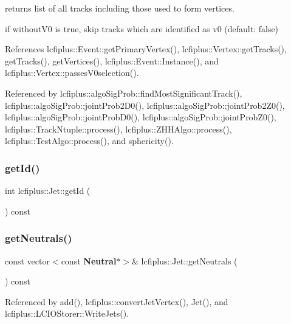 returns list of all tracks including those used to form vertices. 

if without\+V0 is true, skip tracks which are identified as v0 (default\+: false) 

References lcfiplus\+::\+Event\+::get\+Primary\+Vertex(), lcfiplus\+::\+Vertex\+::get\+Tracks(), get\+Tracks(), get\+Vertices(), lcfiplus\+::\+Event\+::\+Instance(), and lcfiplus\+::\+Vertex\+::passes\+V0selection().



Referenced by lcfiplus\+::algo\+Sig\+Prob\+::find\+Most\+Significant\+Track(), lcfiplus\+::algo\+Sig\+Prob\+::joint\+Prob2\+D0(), lcfiplus\+::algo\+Sig\+Prob\+::joint\+Prob2\+Z0(), lcfiplus\+::algo\+Sig\+Prob\+::joint\+Prob\+D0(), lcfiplus\+::algo\+Sig\+Prob\+::joint\+Prob\+Z0(), lcfiplus\+::\+Track\+Ntuple\+::process(), lcfiplus\+::\+Z\+H\+H\+Algo\+::process(), lcfiplus\+::\+Test\+Algo\+::process(), and sphericity().

\mbox{\label{classlcfiplus_1_1Jet_a576906ac38b1e7b70ca983e306eb7e19}} 
\subsubsection{get\+Id()}
{\footnotesize\ttfamily int lcfiplus\+::\+Jet\+::get\+Id (\begin{DoxyParamCaption}{ }\end{DoxyParamCaption}) const\hspace{0.3cm}{\ttfamily [inline]}}

\mbox{\label{classlcfiplus_1_1Jet_ae5e67fe8e61b7640a7c60922cb1e1962}} 
\subsubsection{get\+Neutrals()}
{\footnotesize\ttfamily const vector$<$const \textbf{ Neutral}$\ast$$>$\& lcfiplus\+::\+Jet\+::get\+Neutrals (\begin{DoxyParamCaption}{ }\end{DoxyParamCaption}) const\hspace{0.3cm}{\ttfamily [inline]}}



Referenced by add(), lcfiplus\+::convert\+Jet\+Vertex(), Jet(), and lcfiplus\+::\+L\+C\+I\+O\+Storer\+::\+Write\+Jets().

